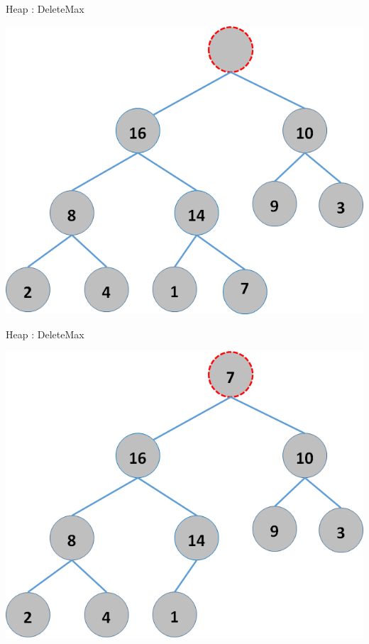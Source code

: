 \documentclass{beamer}
\begin{document}
\begin{frame}{Heap : DeleteMax}
    \begin{center}
        \includegraphics[scale=0.5]{heapDelete2.png}
    \end{center}
\end{frame}


\begin{frame}{Heap : DeleteMax}
    \begin{center}
        \includegraphics[scale=0.5]{heapDelete3.png}
    \end{center}
\end{frame}
\end{document}
